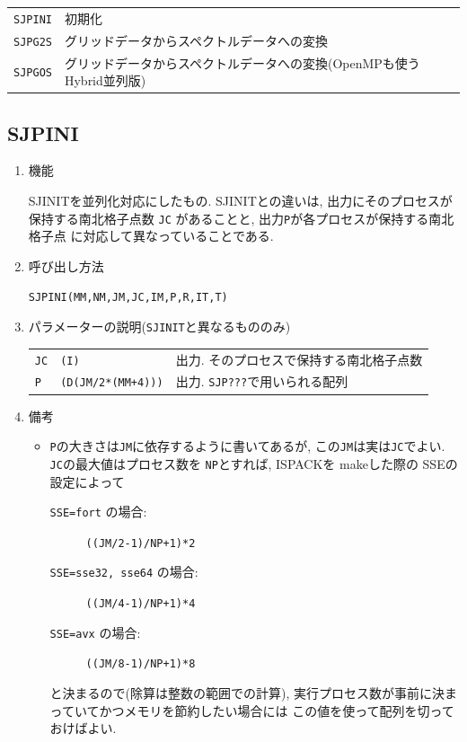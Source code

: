 \documentclass[a4j,fleqn]{jarticle}
\begin{document}
\vspace{1em}
\begin{tabular}{ll}
{\tt SJPINI} & 初期化\\
{\tt SJPG2S} & グリッドデータからスペクトルデータへの変換\\
{\tt SJPGOS} & グリッドデータからスペクトルデータへの変換(OpenMPも使う
 Hybrid並列版)
\end{tabular}


\subsection{SJPINI}

\begin{enumerate}

\item 機能

SJINITを並列化対応にしたもの.
SJINITとの違いは, 出力にそのプロセスが保持する南北格子点数 {\tt JC}
があることと, 出力{\tt P}が各プロセスが保持する南北格子点
に対応して異なっていることである.

\item 呼び出し方法 
    
{\tt SJPINI(MM,NM,JM,JC,IM,P,R,IT,T)}
  
\item パラメーターの説明({\tt SJINIT}と異なるもののみ)
    
\begin{tabular}{lll}
{\tt JC} & {\tt (I)} & 出力. そのプロセスで保持する南北格子点数\\
{\tt P}  & {\tt (D(JM/2*(MM+4)))} & 出力. {\tt SJP???}で用いられる配列\\
\end{tabular}

\item 備考

\begin{itemize}

\item {\tt P}の大きさは{\tt JM}に依存するように書いてあるが,
この{\tt JM}は実は{\tt JC}でよい. {\tt JC}の最大値はプロセス数を
{\tt NP}とすれば, ISPACKを makeした際の SSEの設定によって
\begin{description}
\item[{\tt SSE=fort} の場合:] {\tt ((JM/2-1)/NP+1)*2}
\item[{\tt SSE=sse32, sse64} の場合:] {\tt ((JM/4-1)/NP+1)*4}
\item[{\tt SSE=avx} の場合:] {\tt ((JM/8-1)/NP+1)*8}
\end{description}
と決まるので(除算は整数の範囲での計算), 
実行プロセス数が事前に決まっていてかつメモリを節約したい場合には
この値を使って配列を切っておけばよい.

\end{itemize}

\end{enumerate}
\end{document}
